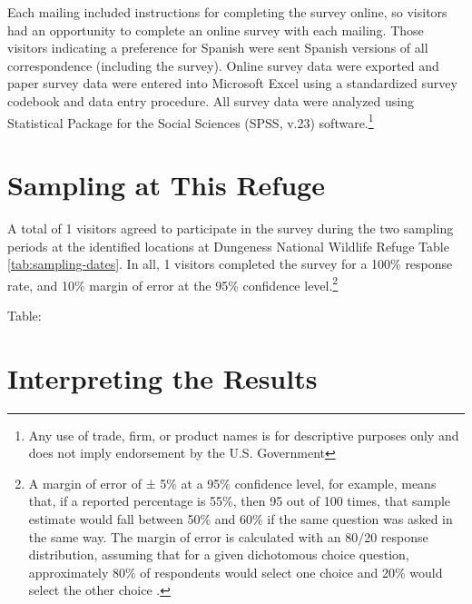 \documentclass[]{book}
\let\rmarkdownfootnote\footnote%
\def\footnote{\protect\rmarkdownfootnote}
\begin{document}
Each mailing included instructions for completing the survey online, so
visitors had an opportunity to complete an online survey with each
mailing. Those visitors indicating a preference for Spanish were sent
Spanish versions of all correspondence (including the survey). Online
survey data were exported and paper survey data were entered into
Microsoft Excel using a standardized survey codebook and data entry
procedure. All survey data were analyzed using Statistical Package for
the Social Sciences (SPSS, v.23) software.\footnote{Any use of trade,
  firm, or product names is for descriptive purposes only and does not
  imply endorsement by the U.S. Government}

\section*{Sampling at This Refuge}\label{sampling-at-this-refuge}

A total of 1 visitors agreed to participate in the survey during the two
sampling periods at the identified locations at Dungeness National
Wildlife Refuge Table \ref{tab:sampling-dates}. In all, 1 visitors
completed the survey for a 100\% response rate, and 10\% margin of error
at the 95\% confidence level.\footnote{A margin of error of ± 5\% at a
  95\% confidence level, for example, means that, if a reported
  percentage is 55\%, then 95 out of 100 times, that sample estimate
  would fall between 50\% and 60\% if the same question was asked in the
  same way. The margin of error is calculated with an 80/20 response
  distribution, assuming that for a given dichotomous choice question,
  approximately 80\% of respondents would select one choice and 20\%
  would select the other choice \citep{salant1994}.}

Table: \label{tab:sampling-dates}

\section*{Interpreting the Results}\label{interpreting-the-results}
\end{document}
